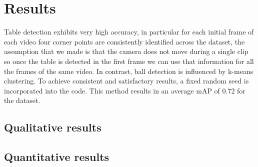 \section{Results}

Table detection exhibits very high accuracy, in particular for each initial frame of each video four corner points are consistently identified across the dataset, the assumption that we made is that the camera does not move during a single clip so once the table is detected in the first frame we can use that information for all the frames of the same video.
In contrast, ball detection is influenced by k-means clustering. To achieve consistent and satisfactory results, a fixed random seed is incorporated into the code. This method results in an average mAP of 0.72 for the dataset.

\subsection{Qualitative results}

\subsection{Quantitative results}
